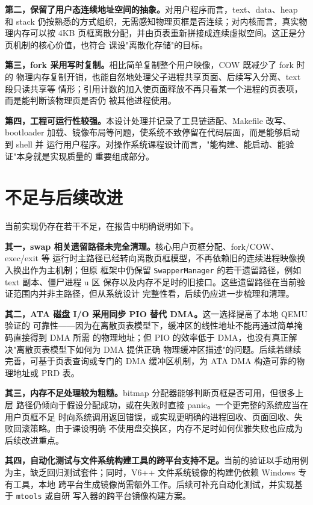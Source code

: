 \textbf{第二，保留了用户态连续地址空间的抽象。}对用户程序而言，text、data、heap 和
stack 仍按熟悉的方式组织，无需感知物理页框是否连续；对内核而言，真实物理内存可以按
4KB 页框离散分配，并由页表重新拼接成连续虚拟空间。这正是分页机制的核心价值，也符合
课设"离散化存储"的目标。

\textbf{第三，fork 采用写时复制。}相比简单复制整个用户映像，COW 既减少了 fork 时的
物理内存复制开销，也能自然地处理父子进程共享页面、后续写入分离、text 段只读共享等
情形；引用计数的加入使页面释放不再只看某一个进程的页表项，而是能判断该物理页是否仍
被其他进程使用。

\textbf{第四，工程可运行性较强。}本设计处理并记录了工具链适配、Makefile 改写、
bootloader 加载、镜像布局等问题，使系统不致停留在代码层面，而是能够启动到 shell 并
运行用户程序。对操作系统课程设计而言，"能构建、能启动、能验证"本身就是实现质量的
重要组成部分。

\section{不足与后续改进}
当前实现仍存在若干不足，在报告中明确说明如下。

\textbf{其一，swap 相关遗留路径未完全清理。}核心用户页框分配、fork/COW、exec/exit 等
运行时主路径已经转向离散页框模型，不再依赖旧的连续进程映像换入换出作为主机制；但原
框架中仍保留 \texttt{SwapperManager} 的若干遗留路径，例如 text 副本、僵尸进程 u 区
保存以及内存不足时的旧接口。这些遗留路径在当前验证范围内并非主路径，但从系统设计
完整性看，后续仍应进一步梳理和清理。

\textbf{其二，ATA 磁盘 I/O 采用同步 PIO 替代 DMA。}这一选择提高了本地 QEMU 验证的
可靠性——因为在离散页表模型下，缓冲区的线性地址不能再通过简单掩码直接得到 DMA 所需
的物理地址；但 PIO 的效率低于 DMA，也没有真正解决"离散页表模型下如何为 DMA 提供正确
物理缓冲区描述"的问题。后续若继续完善，可基于页表查询或专门的 DMA 缓冲区机制，为
ATA DMA 构造可靠的物理地址或 PRD 表。

\textbf{其三，内存不足处理较为粗糙。}bitmap 分配器能够判断页框是否可用，但很多上层
路径仍倾向于假设分配成功，或在失败时直接 panic。一个更完整的系统应当在用户页框不足
时向系统调用返回错误，或实现更明确的进程回收、页面回收、失败回滚策略。由于课设明确
不使用盘交换区，内存不足时如何优雅失败也应成为后续改进重点。

\textbf{其四，自动化测试与文件系统构建工具的跨平台支持不足。}当前的验证以手动用例
为主，缺乏回归测试套件；同时，V6++ 文件系统镜像的构建仍依赖 Windows 专有工具，本地
跨平台生成镜像尚需额外工作。后续可补充自动化测试，并实现基于 \texttt{mtools} 或自研
写入器的跨平台镜像构建方案。
